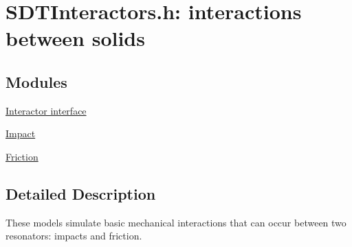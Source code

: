 \hypertarget{group__interactors}{}\section{S\+D\+T\+Interactors.\+h\+: interactions between solids}
\label{group__interactors}
\subsection*{Modules}
\begin{DoxyCompactItemize}
\item 
\hyperlink{group__interactor}{Interactor interface}
\item 
\hyperlink{group__impact}{Impact}
\item 
\hyperlink{group__friction}{Friction}
\end{DoxyCompactItemize}


\subsection{Detailed Description}
These models simulate basic mechanical interactions that can occur between two resonators\+: impacts and friction. 